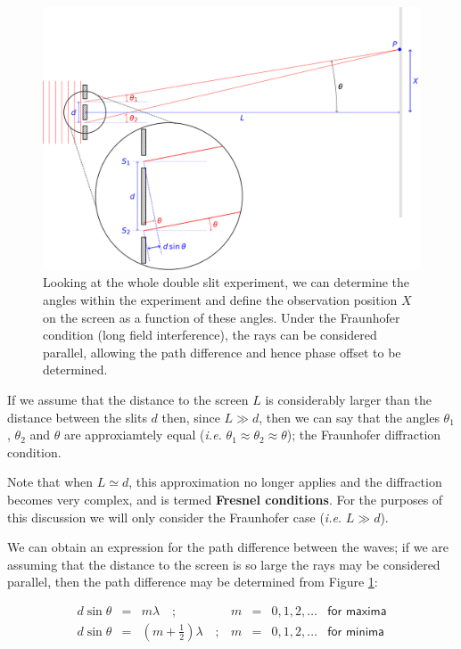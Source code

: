 \documentclass[
]{book}
\begin{document}
\begin{figure}

{\centering \includegraphics[width=0.7\linewidth]{visualisations/LaTeX/ch13-doubleslits2} 

}

\caption{Looking at the whole double slit experiment, we can determine the angles within the experiment and define the observation position $X$ on the screen as a function of these angles. Under the Fraunhofer condition (long field interference), the rays can be considered parallel, allowing the path difference and hence phase offset to be determined.}\label{fig:ch13-doubleslit2}
\end{figure}

If we assume that the distance to the screen \(L\) is considerably larger than the distance between the slits \(d\) then, since \(L \gg d\), then we can say that the angles \(\theta_1\), \(\theta_2\) and \(\theta\) are approxiamtely equal (\emph{i.e.} \(\theta_1 \approx \theta_2 \approx \theta\)); the Fraunhofer diffraction condition.

Note that when \(L \simeq d\), this approximation no longer applies and the diffraction becomes very complex, and is termed \textbf{Fresnel conditions}. For the purposes of this discussion we will only consider the Fraunhofer case (\emph{i.e.} \(L \gg d\)).

We can obtain an expression for the path difference between the waves; if we are assuming that the distance to the screen is so large the rays may be considered parallel, then the path difference may be determined from Figure \ref{fig:ch13-doubleslit2}:

\begin{equation}
\begin{array}{rclrcll}
d\sin\theta &=& m\lambda \quad; & m &=& 0,1,2, \dots &\textsf{for maxima} \\
d\sin\theta &=& \left(m + \frac{1}{2}\right) \lambda \quad; & m &=& 0,1,2, \dots &\textsf{for minima}
\end{array}
\end{equation}
\end{document}
